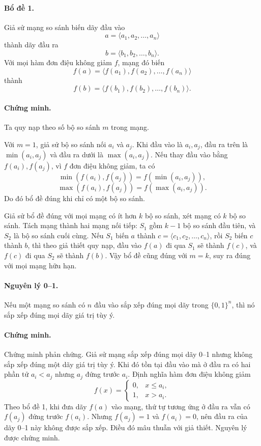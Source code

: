 \documentclass[11pt]{article}
\begin{document}
\paragraph{Bổ đề 1.}
Giả sử mạng so sánh biến dãy đầu vào
\[
  a=\langle a_1,a_2,\ldots,a_n\rangle
\]
thành dãy đầu ra
\[
  b=\langle b_1,b_2,\ldots,b_n\rangle.
\]
Với mọi hàm đơn điệu không giảm $f$, mạng đó biến
\[
  f(a)=\langle f(a_1),f(a_2),\ldots,f(a_n)\rangle
\]
thành
\[
  f(b)=\langle f(b_1),f(b_2),\ldots,f(b_n)\rangle.
\]

\paragraph{Chứng minh.}
Ta quy nạp theo số bộ so sánh $m$ trong mạng.

Với $m=1$, giả sử bộ so sánh nối $a_i$ và $a_j$. Khi đầu vào là $a_i,a_j$, đầu
ra trên là $\min(a_i,a_j)$ và đầu ra dưới là $\max(a_i,a_j)$. Nếu thay đầu vào
bằng $f(a_i),f(a_j)$, vì $f$ đơn điệu không giảm, ta có
\[
  \min(f(a_i),f(a_j))=f(\min(a_i,a_j)),
\]
\[
  \max(f(a_i),f(a_j))=f(\max(a_i,a_j)).
\]
Do đó bổ đề đúng khi chỉ có một bộ so sánh.

Giả sử bổ đề đúng với mọi mạng có ít hơn $k$ bộ so sánh, xét mạng có $k$ bộ so
sánh. Tách mạng thành hai mạng nối tiếp: $S_1$ gồm $k-1$ bộ so sánh đầu tiên,
và $S_2$ là bộ so sánh cuối cùng. Nếu $S_1$ biến $a$ thành
$c=\langle c_1,c_2,\ldots,c_n\rangle$, rồi $S_2$ biến $c$ thành $b$, thì theo
giả thiết quy nạp, đầu vào $f(a)$ đi qua $S_1$ sẽ thành $f(c)$, và $f(c)$ đi
qua $S_2$ sẽ thành $f(b)$. Vậy bổ đề cũng đúng với $m=k$, suy ra đúng với mọi
mạng hữu hạn.

\paragraph{Nguyên lý 0--1.}
Nếu một mạng so sánh có $n$ đầu vào sắp xếp đúng mọi dãy trong $\{0,1\}^n$, thì
nó sắp xếp đúng mọi dãy giá trị tùy ý.

\paragraph{Chứng minh.}
Chứng minh phản chứng. Giả sử mạng sắp xếp đúng mọi dãy 0--1 nhưng không sắp
xếp đúng một dãy giá trị tùy ý. Khi đó tồn tại đầu vào mà ở đầu ra có hai phần
tử $a_i<a_j$ nhưng $a_j$ đứng trước $a_i$. Định nghĩa hàm đơn điệu không giảm
\[
  f(x)=
  \begin{cases}
    0, & x\le a_i,\\
    1, & x>a_i.
  \end{cases}
\]
Theo bổ đề 1, khi đưa dãy $f(a)$ vào mạng, thứ tự tương ứng ở đầu ra vẫn có
$f(a_j)$ đứng trước $f(a_i)$. Nhưng $f(a_j)=1$ và $f(a_i)=0$, nên đầu ra của
dãy 0--1 này không được sắp xếp. Điều đó mâu thuẫn với giả thiết. Nguyên lý
được chứng minh.
\end{document}
